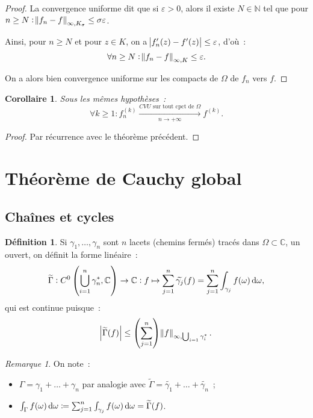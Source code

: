\documentclass{report}
\newtheorem{cor}[thm]{Corollaire}
\theoremstyle{definition}
\newtheorem{déf}[thm]{Définition}
\theoremstyle{remark}
\newtheorem*{rmq}{Remarque}
\numberwithin{equation}{section}
\newcommand{\C}{\mathbb C}
\newcommand{\N}{\mathbb N}
\newcommand{\CONV}[5]{\xrightarrow[#2 \to #3]{#4 \text{ #5 } #1}}
\newcommand{\CVUc}[3]{\CONV{#1}{#2}{#3}{CVU}{sur tout cpct de}}
\newcommand{\pinfty}{{+\infty}}
\begin{document}
\begin{proof}
			La convergence uniforme dit que si $\varepsilon > 0$, alors il existe $N \in \N$ tel que pour
			$n \geq N : \norm {f_n-f}_{\infty, K_\sigma} \leq \sigma\varepsilon$.

			Ainsi, pour $n \geq N$ et pour $z \in K$, on a $\abs {f_n'(z)-f'(z)} \leq \varepsilon$, d'où~:
			\begin{equation}
				\forall n \geq N : \norm {f_n-f}_{\infty, K} \leq \varepsilon.
			\end{equation}

			On a alors bien convergence uniforme sur les compacts de $\Omega$ de $f_n$ vers $f$.
			\end{proof}

			\begin{cor} Sous les mêmes hypothèses~:
			\begin{equation}
				\forall k \geq 1 : f_n^{(k)} \CVUc \Omega n\pinfty f^{(k)}.
			\end{equation}
			\end{cor}

			\begin{proof} Par récurrence avec le théorème précédent.
			\end{proof}
			
	\section{Théorème de Cauchy global}
		\subsection{Chaînes et cycles}
			\begin{déf} Si $\gamma_1, \ldots,  \gamma_n$ sont $n$ lacets (chemins fermés) tracés dans $\Omega \subset \C$, un ouvert, on définit la forme linéaire~:
			\begin{equation}
				\widetilde \Gamma : C^0\left(\bigcup_{i=1}^n\gamma_n^*, \C\right) \to \C :
				f \mapsto \sum_{j=1}^n\widetilde {\gamma_j}(f) = \sum_{j=1}^n\int_{\gamma_j}f(\omega)\dif \omega,
			\end{equation}
			qui est continue puisque~:
			\begin{equation}
				\abs {\widetilde \Gamma(f)} \leq \left(\sum_{j=1}^n\right)\norm f_{\infty, \bigcup_{i=1}\gamma_i^*}.
			\end{equation}
			\end{déf}

			\begin{rmq} On note~:
			\begin{itemize}
				\item $\Gamma = \gamma_1 + \ldots + \gamma_n$ par analogie avec $\widetilde \Gamma = \widetilde {\gamma_1} + \ldots + \widetilde {\gamma_n}$~;
				\item $\int_\Gamma f(\omega)\dif \omega \coloneqq \sum_{j=1}^n\int_{\gamma_j}f(\omega)\dif \omega = \widetilde \Gamma(f)$.
			\end{itemize}
			\end{rmq}
\end{document}
